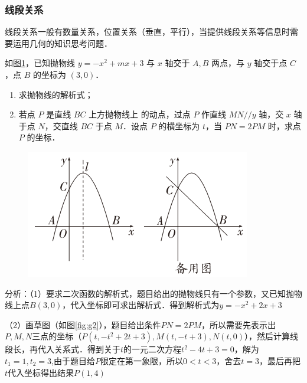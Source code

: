 \subsubsection*{线段关系}
线段关系一般有数量关系，位置关系（垂直，平行），当提供线段关系等信息时需要运用几何的知识思考问题．
\begin{example}
如图\ref{fig:g1}，已知抛物线 \( y = -x^2 + mx + 3 \) 与 \( x \) 轴交于 \( A, B \) 两点，与 \( y \) 轴交于点 \( C \)，点 \( B \) 的坐标为 \((3,0)\)．
\noindent
\begin{enumerate}
    \item 求抛物线的解析式；
    \item 若点 \( P \) 是直线 \( BC \) 上方抛物线上 的动点，过点 \( P \) 作直线 \( MN//y \) 轴，交 \( x \) 轴于点 \( N \)，交直线 \( BC \) 于点 \( M \)．设点 \( P \) 的横坐标为 \( t \)，当 \( PN = 2PM \) 时，求点 \( P \) 的坐标．
\end{enumerate}
\begin{figure}
    \vspace{-1cm}
    \includegraphics[width=1\linewidth]{figure/g1.png}
    \caption{}
    \label{fig:g1}
\end{figure}

\begin{solution}
    分析：（1）要求二次函数的解析式，题目给出的抛物线只有一个参数，又已知抛物线上点\(B(3,0)\)，代入坐标即可求出解析式．得到解析式为\(y=-x^2+2x+3\)
    
    （2）画草图（如图\ref{fig:g2}），题目给出条件\( PN = 2PM \)，所以需要先表示出\(P,M,N\)三点的坐标（\(P(t, -t^2+2t+3), M(t, -t+3), N(t, 0)\)），然后计算线段长，再代入关系式．得到关于\(t\)的一元二次方程\(t^2-4t+3=0\)，解为\(t_1=1,t_2=3\),由于题目给\(P\)限定在第一象限，所以\(0<t<3\)，舍去\(t=3\)，最后再把\(t\)代入坐标得出结果\(P(1, 4)\)
\end{solution}

\end{example}

